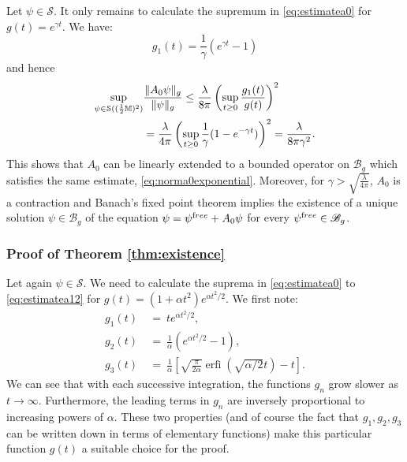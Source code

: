 \documentclass[b5paper,draft,openbib,12pt]{memoir}
\newcommand{\M}{\mathbb{M}}
\newcommand{\free}{{\textup free}}
\newcommand{\Banach}{\mathscr{B}}
\DeclareMathOperator{\erfi}{erfi}
\begin{document}
Let $\psi \in \mathcal{S}$. It only remains to calculate the 
supremum in \eqref{eq:estimatea0} for $g(t)=e^{\gamma t}$. We have:
\begin{equation}
	g_1(t) = \frac{1}{\gamma} \left( e^{\gamma t} - 1\right)
\end{equation}
and hence
\begin{align}
  \sup_{\psi \in \mathcal{S}((\frac{1}{2}\M)^2)} &\frac{\| A_0 \psi \|_g}{\| \psi \|_g} \leq \frac{\lambda}{8\pi} \left( \sup_{t \geq 0} \frac{g_1(t)}{g(t)} \right)^2 \notag\\
  &= \frac{\lambda}{4\pi} \left( \sup_{t \geq 0} \frac{1}{\gamma} (1 - e^{-\gamma t}) \right)^2 = \frac{\lambda}{8\pi \gamma^2}. 
\end{align}
This shows that $A_0$ can be linearly extended to a bounded operator 
on $\Banach_g$ which satisfies the same estimate, 
\eqref{eq:norma0exponential}. Moreover, for $\gamma > 
\sqrt{\frac{\lambda}{4\pi}}$, $A_0$ is a contraction and Banach's 
fixed point theorem implies the existence of a unique solution 
$\psi \in \Banach_g$ of the equation $\psi = \psi^\free + A_0 \psi$ 
for every $\psi^\free \in \Banach_g$.


\subsubsection{Proof of Theorem \ref{thm:existence}} \label{sec:proofexistence}

Let again $\psi \in \mathcal{S}$. We need to calculate the suprema 
in \eqref{eq:estimatea0} to \eqref{eq:estimatea12} for 
$g(t)=(1+\alpha t^2)e^{\alpha t^2/2}$. We first note:
\begin{align}
	g_1(t) ~&=~ t e^{\alpha t^2/2},\nonumber\\
	g_2(t) ~&=~\frac{1}{\alpha} \left( e^{\alpha t^2/2}-1 \right),\nonumber\\
	g_3(t) ~&=~\frac{1}{\alpha} \left[ \sqrt{\frac{\pi}{2\alpha}} \erfi(\sqrt{\alpha/2} t)-t \right].
\end{align}
We can see that with each successive integration, the functions 
$g_n$ grow slower as $t\rightarrow \infty$. Furthermore, the leading 
terms in $g_n$ are inversely proportional to increasing powers of 
$\alpha$. These two properties (and of course the fact that $g_1, 
g_2,g_3$ can be written down in terms of elementary functions) make 
this particular function $g(t)$ a suitable choice for the proof.
\end{document}
